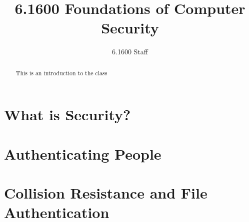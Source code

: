 \documentclass[
letterpaper, %
11pt, %
onecolumn, %
]{memoir}
\author{6.1600 Staff}
\title{6.1600 Foundations of Computer Security}
\begin{document}
\frontmatter

\maketitle

\begin{abstract}
	This is an introduction to the class
\end{abstract}
\clearpage

\tableofcontents*
\clearpage

\mainmatter

\chapter{What is Security?}



\chapter{Authenticating People}



\chapter{Collision Resistance and File Authentication}



\backmatter


% 
% 
\end{document}
